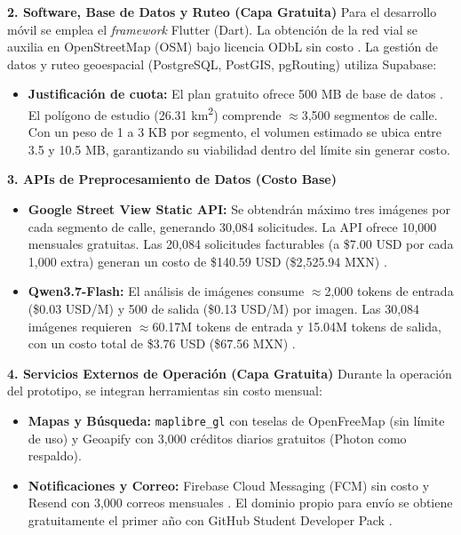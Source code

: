 \textbf{2. Software, Base de Datos y Ruteo (Capa Gratuita)}
Para el desarrollo móvil se emplea el \textit{framework} Flutter (Dart). La obtención de la red vial se auxilia en OpenStreetMap (OSM) bajo licencia ODbL sin costo \cite{osm_legal_pricing}. La gestión de datos y ruteo geoespacial (PostgreSQL, PostGIS, pgRouting) utiliza Supabase:
\begin{itemize}
    \item \textbf{Justificación de cuota:} El plan gratuito ofrece 500 MB de base de datos \cite{supabase_pricing}. El polígono de estudio (26.31 km\textsuperscript{2}) comprende $\approx$3,500 segmentos de calle. Con un peso de 1 a 3 KB por segmento, el volumen estimado se ubica entre 3.5 y 10.5 MB, garantizando su viabilidad dentro del límite sin generar costo.
\end{itemize}

\textbf{3. APIs de Preprocesamiento de Datos (Costo Base)}
\begin{itemize}
    \item \textbf{Google Street View Static API:} Se obtendrán máximo tres imágenes por cada segmento de calle, generando 30,084 solicitudes. La API ofrece 10,000 mensuales gratuitas. Las 20,084 solicitudes facturables (a \$7.00 USD por cada 1,000 extra) generan un costo de \$140.59 USD (\$2,525.94 MXN) \cite{google_maps_pricing}.
    \item \textbf{Qwen3.7-Flash:} El análisis de imágenes consume $\approx$2,000 tokens de entrada (\$0.03 USD/M) y 500 de salida (\$0.13 USD/M) por imagen. Las 30,084 imágenes requieren $\approx$60.17M tokens de entrada y 15.04M tokens de salida, con un costo total de \$3.76 USD (\$67.56 MXN) \cite{qwen_pricing}.
\end{itemize}

\textbf{4. Servicios Externos de Operación (Capa Gratuita)}
Durante la operación del prototipo, se integran herramientas sin costo mensual: 
\begin{itemize}
    \item \textbf{Mapas y Búsqueda:} \texttt{maplibre\_gl} con teselas de OpenFreeMap (sin límite de uso) y Geoapify con 3,000 créditos diarios gratuitos (Photon como respaldo).
    \item \textbf{Notificaciones y Correo:} Firebase Cloud Messaging (FCM) sin costo \cite{firebase_pricing} y Resend con 3,000 correos mensuales \cite{resend_pricing}. El dominio propio para envío se obtiene gratuitamente el primer año con GitHub Student Developer Pack \cite{namecom_student}.
\end{itemize}

